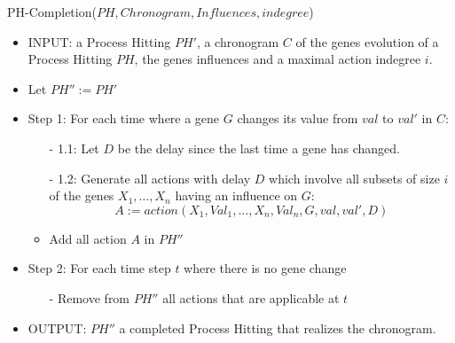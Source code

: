 \begin{algorithm}
	\caption{PH-Completion($PH,Chronogram,Influences,indegree$)}
	\label{alg:PHC}
	\begin{itemize}
		\item INPUT: a Process Hitting $PH'$, a chronogram $C$ of the genes evolution of a Process Hitting $PH$, the genes influences and a maximal action indegree $i$.

		\item Let $PH'' := PH'$
		\item Step 1: For each time where a gene $G$ changes its value from $val$ to $val'$ in $C$:

		\begin{itemize}
			\item[-] 1.1: Let $D$ be the delay since the last time a gene has changed.
			\item[-] 1.2: Generate all actions with delay $D$ which involve all subsets of size $i$ of the genes $X_1, \ldots, X_n$ having an influence on $G$:
			$$A := action(X_1,Val_1,\ldots, X_n,Val_n, G, val, val', D)$$
			\item Add all action $A$ in $PH''$
		\end{itemize}

		\item Step 2: For each time step $t$ where there is no gene change
		\begin{itemize}
			\item[-] Remove from $PH''$ all actions that are applicable at $t$
		\end{itemize}
		\item OUTPUT: $PH''$ a completed Process Hitting that realizes the chronogram.
	\end{itemize}
\end{algorithm}


